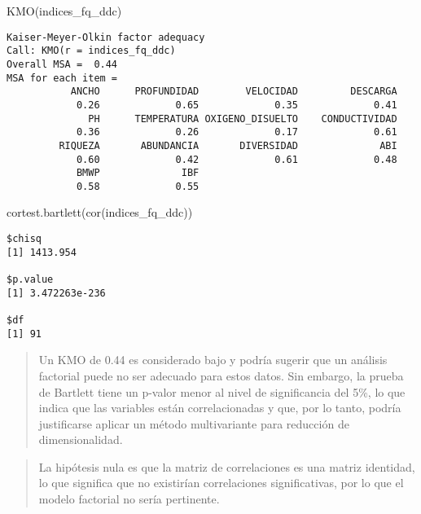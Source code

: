 \documentclass[
  10pt,
  letterpaper,
  DIV=11,
  numbers=noendperiod]{scrreprt}
\newenvironment{Shaded}{\begin{snugshade}}{\end{snugshade}}
\newcommand{\FunctionTok}[1]{\textcolor[rgb]{0.28,0.35,0.67}{#1}}
\newcommand{\NormalTok}[1]{\textcolor[rgb]{0.00,0.23,0.31}{#1}}
\begin{document}
\begin{Shaded}
\begin{Highlighting}[numbers=left,,]
\FunctionTok{KMO}\NormalTok{(indices\_fq\_ddc)}
\end{Highlighting}
\end{Shaded}

\begin{verbatim}
Kaiser-Meyer-Olkin factor adequacy
Call: KMO(r = indices_fq_ddc)
Overall MSA =  0.44
MSA for each item = 
           ANCHO      PROFUNDIDAD        VELOCIDAD         DESCARGA 
            0.26             0.65             0.35             0.41 
              PH      TEMPERATURA OXIGENO_DISUELTO    CONDUCTIVIDAD 
            0.36             0.26             0.17             0.61 
         RIQUEZA       ABUNDANCIA       DIVERSIDAD              ABI 
            0.60             0.42             0.61             0.48 
            BMWP              IBF 
            0.58             0.55 
\end{verbatim}

\begin{Shaded}
\begin{Highlighting}[numbers=left,,]
\FunctionTok{cortest.bartlett}\NormalTok{(}\FunctionTok{cor}\NormalTok{(indices\_fq\_ddc))}
\end{Highlighting}
\end{Shaded}

\begin{verbatim}
$chisq
[1] 1413.954

$p.value
[1] 3.472263e-236

$df
[1] 91
\end{verbatim}

\begin{quote}
Un KMO de 0.44 es considerado bajo y podría sugerir que un análisis
factorial puede no ser adecuado para estos datos. Sin embargo, la prueba
de Bartlett tiene un p-valor menor al nivel de significancia del 5\%, lo
que indica que las variables están correlacionadas y que, por lo tanto,
podría justificarse aplicar un método multivariante para reducción de
dimensionalidad.
\end{quote}

\begin{quote}
La hipótesis nula es que la matriz de correlaciones es una matriz
identidad, lo que significa que no existirían correlaciones
significativas, por lo que el modelo factorial no sería pertinente.
\end{quote}
\end{document}
